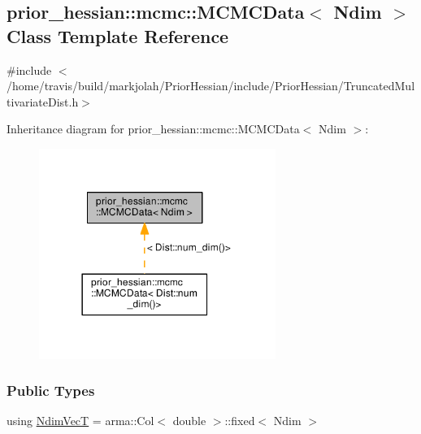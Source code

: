 \hypertarget{classprior__hessian_1_1mcmc_1_1MCMCData}{}\subsection{prior\+\_\+hessian\+:\+:mcmc\+:\+:M\+C\+M\+C\+Data$<$ Ndim $>$ Class Template Reference}
\label{classprior__hessian_1_1mcmc_1_1MCMCData}


{\ttfamily \#include $<$/home/travis/build/markjolah/\+Prior\+Hessian/include/\+Prior\+Hessian/\+Truncated\+Multivariate\+Dist.\+h$>$}



Inheritance diagram for prior\+\_\+hessian\+:\+:mcmc\+:\+:M\+C\+M\+C\+Data$<$ Ndim $>$\+:\nopagebreak
\begin{figure}[H]
\begin{center}
\leavevmode
\includegraphics[width=218pt]{classprior__hessian_1_1mcmc_1_1MCMCData__inherit__graph}
\end{center}
\end{figure}
\subsubsection*{Public Types}
\begin{DoxyCompactItemize}
\item 
using \hyperlink{classprior__hessian_1_1mcmc_1_1MCMCData_a2d9e789ebad080d8af3b0a221c529099}{Ndim\+VecT} = arma\+::\+Col$<$ double $>$\+::fixed$<$ Ndim $>$
\end{DoxyCompactItemize}
